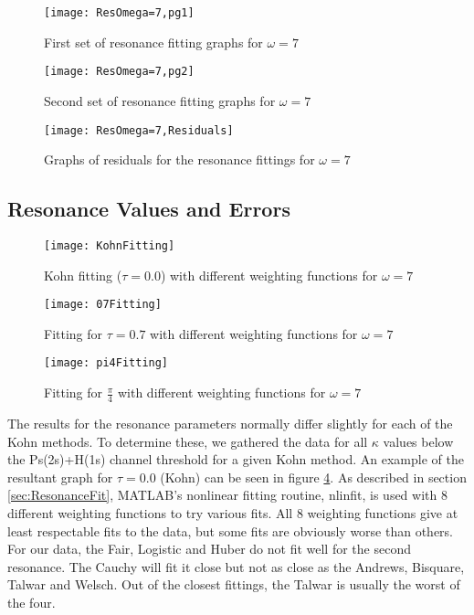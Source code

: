 \documentclass[Dissertation.tex]{subfiles}
\begin{document}
\begin{figure}[H]
	\centering
	\texttt{[image: ResOmega=7,pg1]}
	\caption{First set of resonance fitting graphs for $\omega = 7$}
	\label{fig:ResOmega=7,pg1}
\end{figure}

\begin{figure}[H]
	\centering
	\texttt{[image: ResOmega=7,pg2]}
	\caption{Second set of resonance fitting graphs for $\omega = 7$}
	\label{fig:ResOmega=7,pg2}
\end{figure}

\begin{figure}[H]
	\centering
	\texttt{[image: ResOmega=7,Residuals]}
	\caption{Graphs of residuals for the resonance fittings for $\omega = 7$}
	\label{fig:ResOmega=7,Residuals}
\end{figure}


\subsection{Resonance Values and Errors}
\label{sec:ResonanceErrors}

\begin{figure}[H]
	\centering
	\texttt{[image: KohnFitting]}
	\caption{Kohn fitting ($\tau = 0.0$) with different weighting functions for $\omega = 7$}
	\label{fig:KohnFitting}
\end{figure}

\begin{figure}[H]
	\centering
	\texttt{[image: 07Fitting]}
	\caption{Fitting for $\tau = 0.7$ with different weighting functions for $\omega = 7$}
	\label{fig:07Fitting}
\end{figure}

\begin{figure}[H]
	\centering
	\texttt{[image: pi4Fitting]}
	\caption{Fitting for $\frac{\pi}{4}$ with different weighting functions for $\omega = 7$}
	\label{fig:pi4Fitting}
\end{figure}

The results for the resonance parameters normally differ slightly for each of the Kohn methods.  To determine these, we gathered the data for all $\kappa$ values below the Ps(2s)+H(1s) channel threshold for a given Kohn method.  An example of the resultant graph for $\tau = 0.0$ (Kohn) can be seen in figure \ref{fig:KohnFitting}.  As described in section \ref{sec:ResonanceFit}, MATLAB's nonlinear fitting routine, nlinfit, is used with 8 different weighting functions to try various fits.  All 8 weighting functions give at least respectable fits to the data, but some fits are obviously worse than others.  For our data, the Fair, Logistic and Huber do not fit well for the second resonance.  The Cauchy will fit it close but not as close as the Andrews, Bisquare, Talwar and Welsch.  Out of the closest fittings, the Talwar is usually the worst of the four.
\end{document}
